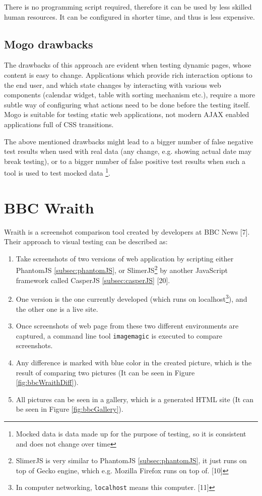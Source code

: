 \documentclass[11pt,oneside,final]{fithesis2}
\begin{document}
  There is no programming script required, therefore it can be used by less skilled human resources. It can be configured in shorter time, and thus is less expensive.
  
  \subsection{Mogo drawbacks}
  
  The drawbacks of this approach are evident when testing dynamic pages, whose content is easy to change. Applications which provide rich interaction options to the end user, and which state
  changes by interacting with various web components (calendar widget, table with sorting mechanism etc.), require a more subtle way of configuring what actions need to be done before the
  testing itself. Mogo is suitable for testing static web applications, not modern AJAX enabled applications full of CSS transitions.
  
  The above mentioned drawbacks might lead to a bigger number of false negative test results when used with real data (any change, e.g. showing actual date may break testing), or to a bigger 
  number of false positive test results when such a tool is used to test mocked data \footnote{Mocked data is data made up for the purpose of testing, so it is consistent and does not 
  change over time}.
  
  \section{BBC Wraith}
  Wraith is a screenshot comparison tool created by developers at BBC News [7]. Their approach to visual testing can be described as:
  \begin{enumerate}
   \item Take screenshots of two versions of web application by scripting either PhantomJS \ref{subsec:phantomJS}, or SlimerJS\footnote{SlimerJS is 
   very similar to PhantomJS \ref{subsec:phantomJS}, it just runs on top of Gecko engine, which e.g. Mozilla Firefox runs on top of. [10]} by another JavaScript framework called 
   CasperJS \ref{subsec:casperJS} [20].
   \item One version is the one currently developed (which runs on localhost\footnote{In computer networking, \texttt{localhost} means this computer. [11]}), and the other one is a live site.
   \item Once screenshots of web page from these two different environments are captured, a command line tool \texttt{imagemagic} is executed to compare screenshots.
   \item Any difference is marked with blue color in the created picture, which is the result of comparing two pictures (It can be seen in Figure \ref{fig:bbcWraithDiff}).
   \item All pictures can be seen in a gallery, which is a generated HTML site (It can be seen in Figure \ref{fig:bbcGallery}).
  \end{enumerate}
  
\end{document}
